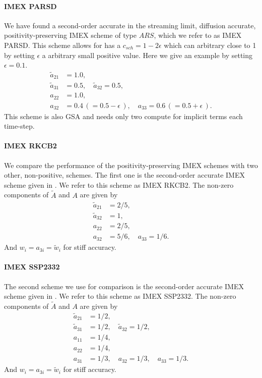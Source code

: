 \paragraph{IMEX PARSD}

We have found a second-order accurate in the streaming limit, diffusion accurate, positivity-preserving IMEX scheme of type $ARS$, which we refer to as IMEX PARSD.  
This scheme allows for has a $c_{sch}= 1 - 2\epsilon$ which can arbitrary close to 1 by setting $\epsilon$ a arbitrary small positive value.
Here we give an example by setting $\epsilon=0.1$.
\begin{align}
  \tilde{a}_{21} & = 1.0, \nonumber \\
  \tilde{a}_{31} & = 0.5, \quad \tilde{a}_{32} = 0.5, \nonumber \\
  a_{22} & = 1.0, \nonumber \\
  a_{32} & = 0.4 \,( = 0.5 - \epsilon\,), \quad a_{33} = 0.6 \,( = 0.5 + \epsilon\,). \nonumber
\end{align} 
This scheme is also GSA and needs only two compute for implicit terms each time-step.

\paragraph{IMEX RKCB2}

We compare the performance of the positivity-preserving IMEX schemes with two other, non-positive, schemes.  
The first one is the second-order accurate IMEX scheme given in \cite{cavaglieriBewley2015}.  
We refer to this scheme as IMEX RKCB2.  
The non-zero components of $\tilde{A}$ and $A$ are given by
\begin{align}
  \tilde{a}_{21} &= 2/5, \nonumber \\
  \tilde{a}_{32} &= 1, \nonumber \\
  a_{22} &= 2/5, \nonumber \\
  a_{32} &= 5/6, \quad a_{33} = 1/6. \nonumber
\end{align}
And $w_{i} = a_{3i} = \tilde{w}_{i}$ for stiff accuracy.

\paragraph{IMEX SSP2332}

The second scheme we use for comparison is the second-order accurate IMEX scheme given in \cite{pareschiRusso_2005}.  
We refer to this scheme as IMEX SSP2332.  
The non-zero components of $\tilde{A}$ and $A$ are given by
\begin{align}
  \tilde{a}_{21} &= 1/2, \nonumber \\
  \tilde{a}_{31} &= 1/2, \quad \tilde{a}_{32} = 1/2, \nonumber \\
  a_{11} &= 1/4, \nonumber \\
  a_{22} &= 1/4, \nonumber \\
  a_{31} &= 1/3, \quad a_{32} = 1/3, \quad a_{33} = 1/3. \nonumber
\end{align}
And $w_{i} = a_{3i} = \tilde{w}_{i}$ for stiff accuracy.

